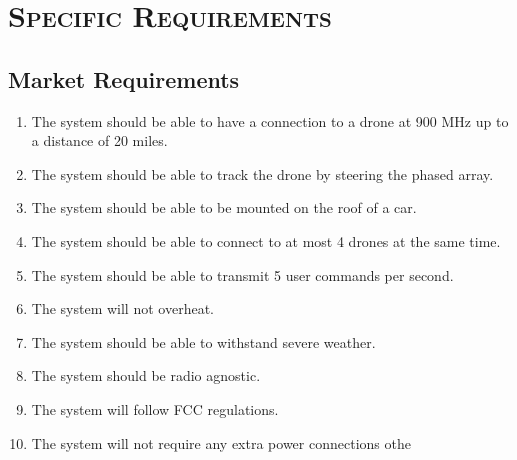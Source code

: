 \documentclass[ProjectRequirements.tex]{subfiles}
\begin{document}
\bigskip

\section{\textsc{\Large Specific Requirements}}
	\subsection{Market Requirements}
	\begin{enumerate}
		\item The system should be able to have a connection to a drone at 900 MHz up to a distance of 20 miles.
		\item The system should be able to track the drone by steering the phased array.
		\item The system should be able to be mounted on the roof of a car.
		\item The system should be able to connect to at most 4 drones at the same time.
		\item The system should be able to transmit 5 user commands per second.
		\item The system will not overheat.
		\item The system should be able to withstand severe weather.
		\item The system should be radio agnostic.
		\item The system will follow FCC regulations.
		\item The system will not require any extra power connections othe
	\end{enumerate}
\end{document}
